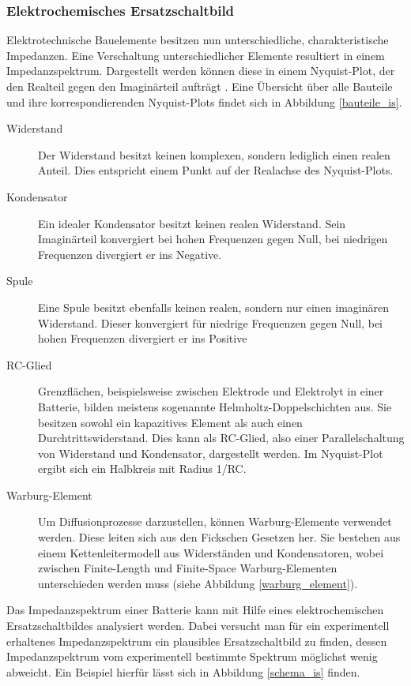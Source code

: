 \documentclass[a4paper, 11pt, headsepline,footsepline,twoside,abstract]{scrbook}
\begin{document}
\subsubsection{Elektrochemisches Ersatzschaltbild}
Elektrotechnische Bauelemente besitzen nun unterschiedliche, charakteristische Impedanzen. Eine Verschaltung unterschiedlicher Elemente resultiert in einem Impedanzspektrum. Dargestellt werden können diese in einem Nyquist-Plot, der den Realteil gegen den Imaginärteil aufträgt \cite{Hamann2005}. Eine Übersicht über alle Bauteile und ihre korrespondierenden Nyquist-Plots findet sich in Abbildung \ref{bauteile_is}.
\begin{description}
\item[Widerstand] Der Widerstand besitzt keinen komplexen, sondern lediglich einen realen Anteil. Dies entspricht einem Punkt auf der Realachse des Nyquist-Plots.
\item[Kondensator] Ein idealer Kondensator besitzt keinen realen Widerstand. Sein Imaginärteil konvergiert bei hohen Frequenzen gegen Null, bei niedrigen Frequenzen divergiert er ins Negative.
\item[Spule] Eine Spule besitzt ebenfalls keinen realen, sondern nur einen imaginären Widerstand. Dieser konvergiert für niedrige Frequenzen gegen Null, bei hohen Frequenzen divergiert er ins Positive
\item[RC-Glied] Grenzflächen, beispielsweise zwischen Elektrode und Elektrolyt in einer Batterie, bilden meistens sogenannte Helmholtz-Doppelschichten aus. Sie besitzen sowohl ein kapazitives Element als auch einen Durchtrittswiderstand. Dies kann als RC-Glied, also einer Parallelschaltung von Widerstand und Kondensator, dargestellt werden. Im Nyquist-Plot ergibt sich ein Halbkreis mit Radius 1/RC.
\item[Warburg-Element] Um Diffusionprozesse darzustellen, können Warburg-Elemente verwendet werden. Diese leiten sich aus den Fickschen Gesetzen her. Sie bestehen aus einem Kettenleitermodell aus Widerständen und Kondensatoren, wobei zwischen Finite-Length und Finite-Space Warburg-Elementen unterschieden werden muss (siehe Abbildung \ref{warburg_element}).
\end{description}
Das Impedanzspektrum einer Batterie kann mit Hilfe eines elektrochemischen Ersatzschaltbildes analysiert werden. Dabei versucht man für ein experimentell erhaltenes Impedanzspektrum ein plausibles Ersatzschaltbild zu finden, dessen Impedanzspektrum vom experimentell bestimmte Spektrum möglichst wenig abweicht. Ein Beispiel hierfür lässt sich in Abbildung \ref{schema_is} finden.
\end{document}
